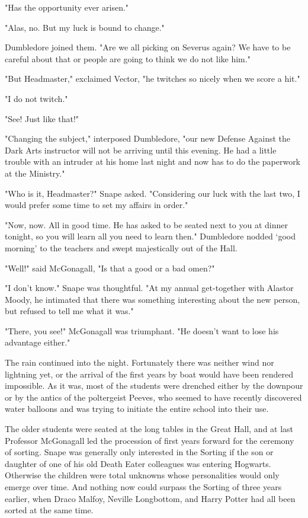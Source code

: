 "Has the opportunity ever arisen."

"Alas, no. But my luck is bound to change."

Dumbledore joined them. "Are we all picking on Severus again? We have to be careful about that or people are going to think we do not like him."

"But Headmaster," exclaimed Vector, "he twitches so nicely when we score a hit."

"I do not twitch."

"See! Just like that!"

"Changing the subject," interposed Dumbledore, "our new Defense Against the Dark Arts instructor will not be arriving until this evening. He had a little trouble with an intruder at his home last night and now has to do the paperwork at the Ministry."

"Who is it, Headmaster?" Snape asked. "Considering our luck with the last two, I would prefer some time to set my affairs in order."

"Now, now. All in good time. He has asked to be seated next to you at dinner tonight, so you will learn all you need to learn then." Dumbledore nodded `good morning' to the teachers and swept majestically out of the Hall.

"Well!" said McGonagall, "Is that a good or a bad omen?"

"I don't know." Snape was thoughtful. "At my annual get-together with Alastor Moody, he intimated that there was something interesting about the new person, but refused to tell me what it was."

"There, you see!" McGonagall was triumphant. "He doesn't want to lose his advantage either."

The rain continued into the night. Fortunately there was neither wind nor lightning yet, or the arrival of the first years by boat would have been rendered impossible. As it was, most of the students were drenched either by the downpour or by the antics of the poltergeist Peeves, who seemed to have recently discovered water balloons and was trying to initiate the entire school into their use.

The older students were seated at the long tables in the Great Hall, and at last Professor McGonagall led the procession of first years forward for the ceremony of sorting. Snape was generally only interested in the Sorting if the son or daughter of one of his old Death Eater colleagues was entering Hogwarts. Otherwise the children were total unknowns whose personalities would only emerge over time. And nothing now could surpass the Sorting of three years earlier, when Draco Malfoy, Neville Longbottom, and Harry Potter had all been sorted at the same time.


